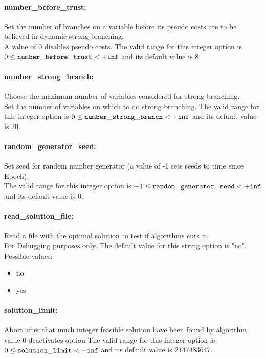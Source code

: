 \paragraph{number\_before\_trust:}\label{opt:number_before_trust} Set the number of branches on a variable before its pseudo costs are to be believed in dynamic strong branching. \\
 A value of 0 disables pseudo costs. The valid range for this integer option is
$0 \le {\tt number\_before\_trust } <  {\tt +inf}$
and its default value is $8$.


\paragraph{number\_strong\_branch:}\label{opt:number_strong_branch} Choose the maximum number of variables considered for strong branching. \\
 Set the number of variables on which to do strong branching. The valid range for this integer option is
$0 \le {\tt number\_strong\_branch } <  {\tt +inf}$
and its default value is $20$.


\paragraph{random\_generator\_seed:}\label{opt:random_generator_seed} Set seed for random number generator (a value of -1 sets seeds to time since Epoch). \\
 The valid range for this integer option is
$-1 \le {\tt random\_generator\_seed } <  {\tt +inf}$
and its default value is $0$.


\paragraph{read\_solution\_file:}\label{opt:read_solution_file} Read a file with the optimal solution to test if algorithms cuts it. \\
 For Debugging purposes only. The default value for this string option is "no".
\\ 
Possible values:
\begin{itemize}
   \item no
   \item yes
\end{itemize}

\paragraph{solution\_limit:}\label{opt:solution_limit} Abort after that much integer feasible solution have been found by algorithm \\
 value 0 deactivates option The valid range for this integer option is
$0 \le {\tt solution\_limit } <  {\tt +inf}$
and its default value is $2147483647$.


